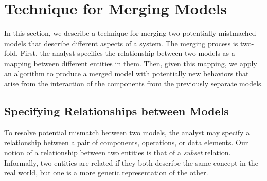 
\section{Technique for Merging Models}
\label{sec-merging}

In this section, we describe a technique for merging two potentially
mistmached models that describe different aspects of a system. The
merging process is two-fold. First, the analyst specifies the
relationship between two models as a mapping between different
entities in them. Then, given this mapping, we apply an algorithm to
produce a merged model with potentially new behaviors that arise
from the interaction of the components from the previously separate
models.

\subsection{Specifying Relationships between Models}
\label{sec-relationship}

To resolve potential mismatch between two models, the analyst may
specify a relationship between a pair of components, operations, or data
elements. Our notion of a relationship between two entities is that of
a \textit{subset} relation. Informally, two entities are related if
they both describe the same concept in the real world, but one is a
more generic representation of the other. 

